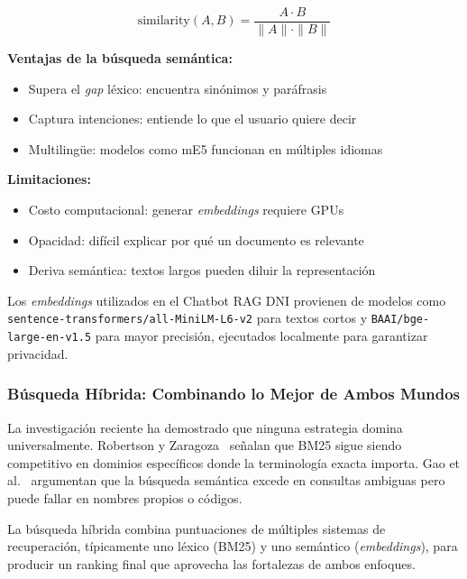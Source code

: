 \begin{equation}
\label{eq:cosine-similarity}
\text{similarity}(A, B) = \frac{A \cdot B}{\|A\| \cdot \|B\|}
\end{equation}

\textbf{Ventajas de la b\'usqueda sem\'antica:}
\begin{itemize}
    \item Supera el \textit{gap} l\'exico: encuentra sin\'onimos y par\'afrasis
    \item Captura intenciones: entiende lo que el usuario quiere decir
    \item Multiling\"ue: modelos como mE5 funcionan en m\'ultiples idiomas
\end{itemize}

\textbf{Limitaciones:}
\begin{itemize}
    \item Costo computacional: generar \textit{embeddings} requiere GPUs
    \item Opacidad: dif\'icil explicar por qu\'e un documento es relevante
    \item Deriva sem\'antica: textos largos pueden diluir la representaci\'on
\end{itemize}

Los \textit{embeddings} utilizados en el Chatbot RAG DNI provienen de modelos como \texttt{sentence-transformers/all-MiniLM-L6-v2} para textos cortos y \texttt{BAAI/bge-large-en-v1.5} para mayor precisi\'on, ejecutados localmente para garantizar privacidad.

\subsubsection{B\'usqueda H\'ibrida: Combinando lo Mejor de Ambos Mundos}
\label{subsubsec:busqueda-hibrida}

La investigaci\'on reciente ha demostrado que ninguna estrategia domina universalmente. Robertson y Zaragoza~\cite{robertson2009bm25} se\~nalan que BM25 sigue siendo competitivo en dominios espec\'ificos donde la terminolog\'ia exacta importa. Gao et al.~\cite{gao2023retrieval} argumentan que la b\'usqueda sem\'antica excede en consultas ambiguas pero puede fallar en nombres propios o c\'odigos.

La b\'usqueda h\'ibrida combina puntuaciones de m\'ultiples sistemas de recuperaci\'on, t\'ipicamente uno l\'exico (BM25) y uno sem\'antico (\textit{embeddings}), para producir un ranking final que aprovecha las fortalezas de ambos enfoques.

